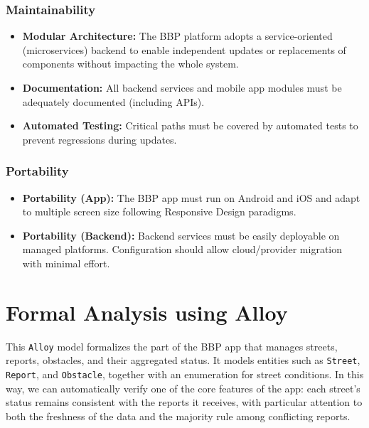 \documentclass{Configuration_Files/PoliMi3i_thesis}
\begin{document}
\newpage
\subsection{Maintainability}
\begin{itemize}
    \item \textbf{Modular Architecture:}
    The BBP platform adopts a service-oriented (microservices) backend to enable independent updates or replacements of components without impacting the whole system.
    
    \item \textbf{Documentation:}
    All backend services and mobile app modules must be adequately documented (including APIs).
    
    \item \textbf{Automated Testing:}
    Critical paths must be covered by automated tests to prevent regressions during updates.
\end{itemize}

\subsection{Portability }
\begin{itemize}
    \item \textbf{Portability (App):} The BBP app must run on Android and iOS and adapt to multiple screen size following Responsive Design paradigms. 
    
    \item \textbf{Portability (Backend):} Backend services must be easily deployable on managed platforms. Configuration should allow cloud/provider migration with minimal effort.  
\end{itemize}

\chapter{Formal Analysis using Alloy}
This \texttt{Alloy} model formalizes the part of the BBP app that manages streets, reports, obstacles, and their aggregated status. It models entities such as \texttt{Street}, \texttt{Report}, and \texttt{Obstacle}, together with an enumeration for street conditions. In this way, we can automatically verify one of the core features of the app: each street’s status remains consistent with the reports it receives, with particular attention to both the freshness of the data and the majority rule among conflicting reports.
\end{document}
